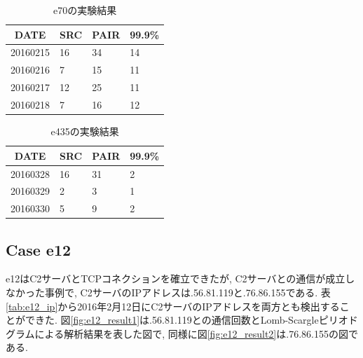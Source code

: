 \documentclass[twocolumn,10pt]{ltjsarticle}
\begin{document}
\begin{table}[htbp]
    \centering
    \caption{e70の実験結果}

    \begin{tabular}{c||lll}
        \hline
        DATE & SRC & PAIR & 99.9\% \\
        \hline \hline
        20160215  & 16 & 34 & 14 \\
        20160216  & 7  & 15 & 11 \\
        20160217  & 12 & 25 & 11 \\
        20160218  & 7  & 16 & 12 \\
        \hline
    \end{tabular}

    \label{tab:e70}
\end{table}

\begin{table}[htbp]
    \centering
    \caption{e435の実験結果}

    \begin{tabular}{c||lll}
        \hline
        DATE & SRC & PAIR & 99.9\% \\
        \hline \hline
        20160328 & 16 & 31 & 2 \\
        20160329 & 2  & 3  & 1 \\
        20160330 & 5  & 9  & 2 \\
        \hline
    \end{tabular}

    \label{tab:e435}
\end{table}

\subsection{Case e12}
e12はC2サーバとTCPコネクションを確立できたが, C2サーバとの通信が成立しなかった事例で, C2サーバのIPアドレスは\ast\ast\ast.56.81.119と\ast\ast\ast.76.86.155である. 表\ref{tab:e12_ip}から2016年2月12日にC2サーバのIPアドレスを両方とも検出することができた. 図\ref{fig:e12_result1}は\ast\ast\ast.56.81.119との通信回数とLomb-Scargleピリオドグラムによる解析結果を表した図で, 同様に図\ref{fig:e12_result2}は\ast\ast\ast.76.86.155の図である. 
\end{document}
